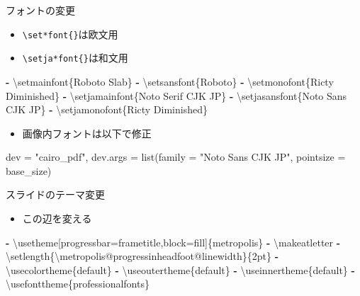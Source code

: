 \documentclass[
  12pt,
  ignorenonframetext,
]{beamer}
\newenvironment{Shaded}{\begin{snugshade}}{\end{snugshade}}
\newcommand{\AttributeTok}[1]{\textcolor[rgb]{0.77,0.63,0.00}{#1}}
\newcommand{\KeywordTok}[1]{\textcolor[rgb]{0.13,0.29,0.53}{\textbf{#1}}}
\providecommand{\tightlist}{%
  \setlength{\itemsep}{0pt}\setlength{\parskip}{0pt}}
\begin{document}
\begin{frame}[fragile]{フォントの変更}
\protect\hypertarget{ux30d5ux30a9ux30f3ux30c8ux306eux5909ux66f4}{}

\begin{itemize}
\tightlist
\item
  \texttt{\textbackslash{}set*font\{\}}は欧文用
\item
  \texttt{\textbackslash{}setja*font\{\}}は和文用
\end{itemize}

\begin{Shaded}
\begin{Highlighting}[]
\KeywordTok{-}\AttributeTok{ \textbackslash{}setmainfont\{Roboto Slab\}}
\KeywordTok{-}\AttributeTok{ \textbackslash{}setsansfont\{Roboto\}}
\KeywordTok{-}\AttributeTok{ \textbackslash{}setmonofont\{Ricty Diminished\}}
\KeywordTok{-}\AttributeTok{ \textbackslash{}setjamainfont\{Noto Serif CJK JP\}}
\KeywordTok{-}\AttributeTok{ \textbackslash{}setjasansfont\{Noto Sans CJK JP\}}
\KeywordTok{-}\AttributeTok{ \textbackslash{}setjamonofont\{Ricty Diminished\}}
\end{Highlighting}
\end{Shaded}

\begin{itemize}
\tightlist
\item
  画像内フォントは以下で修正
\end{itemize}

\begin{Shaded}
\begin{Highlighting}[]
\AttributeTok{dev = "cairo_pdf", dev.args = list(family = "Noto Sans CJK JP", pointsize = base_size)}
\end{Highlighting}
\end{Shaded}

\end{frame}

\begin{frame}[fragile]{スライドのテーマ変更}
\protect\hypertarget{ux30b9ux30e9ux30a4ux30c9ux306eux30c6ux30fcux30deux5909ux66f4}{}

\begin{itemize}
\tightlist
\item
  この辺を変える
\end{itemize}

\begin{Shaded}
\begin{Highlighting}[]
\KeywordTok{-}\AttributeTok{ \textbackslash{}usetheme[progressbar=frametitle,block=fill]\{metropolis\}}
\KeywordTok{-}\AttributeTok{ \textbackslash{}makeatletter}
\KeywordTok{-}\AttributeTok{ \textbackslash{}setlength\{\textbackslash{}metropolis@progressinheadfoot@linewidth\}\{2pt\}}
\KeywordTok{-}\AttributeTok{ \textbackslash{}usecolortheme\{default\}}
\KeywordTok{-}\AttributeTok{ \textbackslash{}useoutertheme\{default\}}
\KeywordTok{-}\AttributeTok{ \textbackslash{}useinnertheme\{default\}}
\KeywordTok{-}\AttributeTok{ \textbackslash{}usefonttheme\{professionalfonts\}}
\end{Highlighting}
\end{Shaded}

\end{frame}
\end{document}
